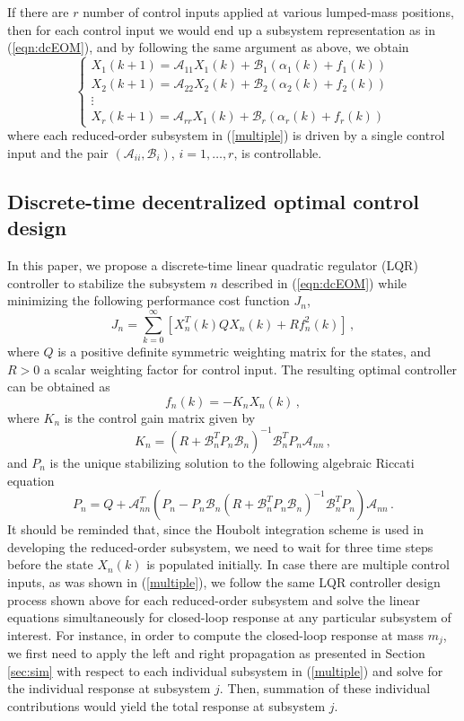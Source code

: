 \documentclass[11pt]{ucthesis}
\newcommand{\beq}{\begin{equation}}
\newcommand{\eeq}{\end{equation}}
\begin{document}
If there are $r$ number of control inputs applied at various lumped-mass positions, then for each control input we would end up a subsystem representation as in (\ref{eqn:dcEOM}), and by following the same argument as above, we obtain 
\beq		\label{multiple}
\left \{
\begin{array}{l}
X_1(k+1) = \mathcal{A}_{11} X_1(k) + \mathcal{B}_1 (\alpha_1 (k) +f_{1} (k) )  \\
X_2(k+1) = \mathcal{A}_{22} X_2(k) + \mathcal{B}_2 (\alpha_2 (k) +f_{2} (k) )  \\
\vdots \\
X_r (k+1) = \mathcal{A}_{rr} X_1(k) + \mathcal{B}_r (\alpha_r (k) +f_{r} (k) ) 
\end{array}
\right .
\eeq
where each reduced-order subsystem in (\ref{multiple}) is driven by a single control input and the pair $(\mathcal{A}_{ii}, \mathcal{B}_i)$, $i = 1,\dots,r$, is controllable. 

\subsection{Discrete-time decentralized optimal control design}	\label{dcontrol}

In this paper, we propose a discrete-time linear quadratic regulator (LQR) controller to stabilize the subsystem $n$ described in (\ref{eqn:dcEOM}) while minimizing the following performance cost function $J_n$,
\beq		\label{lqr1}
J_n = \sum_{k=0}^{\infty} \left [ X_{n}^{T} (k) Q X_{n}(k) + R f^{2}_{n} (k) \right ]\,,
\eeq
where $Q$ is a positive definite symmetric weighting matrix for the states, and $R>0$ a scalar weighting factor for control input. The resulting optimal controller can be obtained as
\beq		\label{lqr2}
f_n (k) = - K_n X_n (k) \,,
\eeq
where $K_n$ is the control gain matrix given by
\beq		\label{lqr3}
K_n = (R+\mathcal{B}_n^{T} P_n \mathcal{B}_n)^{-1} \mathcal{B}_n^{T} P_n \mathcal{A}_{nn} \,,
\eeq
and $P_n$ is the unique stabilizing solution to the following algebraic Riccati equation
\[
P_n = Q + \mathcal{A}_{nn}^T(P_n-P_n \mathcal{B}_n (R +\mathcal{B}_n^T P_n \mathcal{B}_n)^{-1} \mathcal{B}_n^T P_n) \mathcal{A}_{nn}\,.
\]
It should be reminded that, since the Houbolt integration scheme is used in developing the reduced-order subsystem, we need to wait for three time steps before the state $X_n (k)$ is populated initially. In case there are multiple control inputs, as was shown in (\ref{multiple}), we follow the same LQR controller design process shown above for each reduced-order subsystem and solve the linear equations simultaneously for closed-loop response at any particular subsystem of interest. For instance, in order to compute the closed-loop response at mass $m_j$, we first need to apply the left and right propagation as presented in Section \ref{sec:sim} with respect to each individual subsystem in (\ref{multiple}) and solve for the individual response at subsystem $j$. Then, summation of these individual contributions would yield the total response at subsystem $j$.
\end{document}
